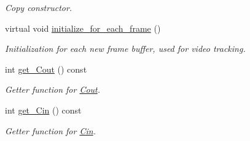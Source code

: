 \begin{DoxyCompactItemize}
\begin{DoxyCompactList}\small\item\em Copy constructor. \end{DoxyCompactList}\item 
\hypertarget{classofeli_1_1_a_cwithout_edges_a73ac34cabdc4aae95531996e394d59a7}{virtual void \hyperlink{classofeli_1_1_a_cwithout_edges_a73ac34cabdc4aae95531996e394d59a7}{initialize\-\_\-for\-\_\-each\-\_\-frame} ()}\label{classofeli_1_1_a_cwithout_edges_a73ac34cabdc4aae95531996e394d59a7}

\begin{DoxyCompactList}\small\item\em Initialization for each new frame buffer, used for video tracking. \end{DoxyCompactList}\item 
\hypertarget{classofeli_1_1_a_cwithout_edges_af6248d9b93cf8a651824216b2dd175b9}{int \hyperlink{classofeli_1_1_a_cwithout_edges_af6248d9b93cf8a651824216b2dd175b9}{get\-\_\-\-Cout} () const }\label{classofeli_1_1_a_cwithout_edges_af6248d9b93cf8a651824216b2dd175b9}

\begin{DoxyCompactList}\small\item\em Getter function for \hyperlink{classofeli_1_1_a_cwithout_edges_a02c32b73dcc676251330a42b6fb4e6f4}{Cout}. \end{DoxyCompactList}\item 
\hypertarget{classofeli_1_1_a_cwithout_edges_ad4da88f6edd9e97f16d783182a1bcb3a}{int \hyperlink{classofeli_1_1_a_cwithout_edges_ad4da88f6edd9e97f16d783182a1bcb3a}{get\-\_\-\-Cin} () const }\label{classofeli_1_1_a_cwithout_edges_ad4da88f6edd9e97f16d783182a1bcb3a}

\begin{DoxyCompactList}\small\item\em Getter function for \hyperlink{classofeli_1_1_a_cwithout_edges_af26f696be73588b2a150c3eef6f62c85}{Cin}. \end{DoxyCompactList}\end{DoxyCompactItemize}
